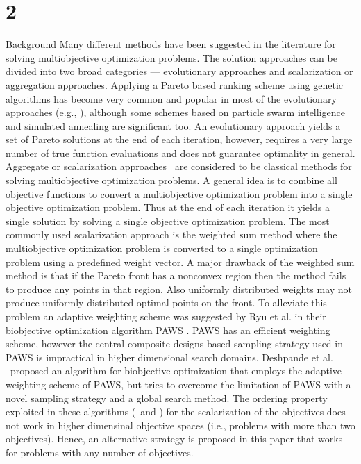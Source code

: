 \section{2}{Background} 
Many different methods have been suggested in the literature for solving 
multiobjective optimization problems. The solution approaches can be divided 
into two broad categories --- evolutionary approaches and scalarization or 
aggregation approaches. Applying a Pareto based ranking scheme using 
genetic algorithms has become very common and popular in most of the 
evolutionary approaches (e.g., \DPAM), although some schemes based on 
particle swarm intelligence and simulated annealing are significant too. 
An evolutionary approach yields a set of Pareto solutions at the end of each 
iteration, however, requires a very large number of true function evaluations 
and does not guarantee optimality in general. Aggregate or scalarization 
approaches \E\ are considered to be classical methods for solving 
multiobjective optimization problems. A general idea is to combine all 
objective functions to convert a multiobjective optimization problem into a 
single objective optimization problem. Thus at the end of each iteration it 
yields a single solution by solving a single objective optimization problem.
The most commonly used scalarization approach is the weighted sum method 
where the multiobjective optimization problem is converted to a single 
optimization problem using a predefined weight vector. A major drawback 
of the weighted sum method is that if the Pareto front has a nonconvex 
region then the method fails to produce any points in that region. Also uniformly
distributed weights may not produce uniformly distributed optimal points on the 
front. To alleviate this problem an adaptive weighting scheme was suggested 
by Ryu et al. in their biobjective optimization algorithm PAWS \RKW. PAWS 
has an efficient weighting scheme, however the central composite designs based 
sampling strategy used in PAWS is impractical in higher dimensional search 
domains. Deshpande et al. \DWC\ proposed an algorithm for biobjective 
optimization that employs the adaptive weighting scheme of PAWS, but 
tries to overcome the limitation of PAWS with a novel sampling strategy 
and a global search method. The ordering property exploited in these algorithms 
(\RKW\ and \DWC) for the scalarization of the objectives does not work in 
higher dimensinal objective spaces (i.e., problems with more than two 
objectives). Hence, an alternative strategy is proposed in this paper that 
works for problems with any number of objectives. 

